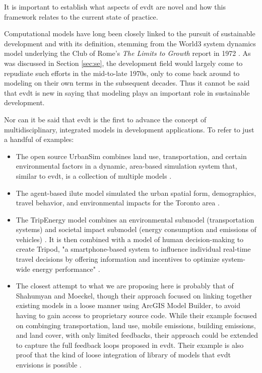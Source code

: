 \documentclass[notitlepage]{article}
\begin{document}
It is important to establish what aspects of \ac{evdt} are novel and how this framework relates to the current state of practice. 

Computational models have long been closely linked to the pursuit of sustainable development and with its definition, stemming from the World3 system dynamics model underlying the Club of Rome's \textit{The Limits to Growth} report in 1972 \cite{meadowsLimitsGrowth1972}. As was discussed in Section \ref{sec:se}, the development field would largely come to repudiate such efforts in the mid-to-late 1970s, only to come back around to modeling on their own terms in the subsequent decades. Thus it cannot be said that \ac{evdt} is new in saying that modeling plays an important role in sustainable development. 

Nor can it be said that \ac{evdt} is the first to advance the concept of multidisciplinary, integrated models in development applications. To refer to just a handful of examples:

\begin{itemize} \setlength{\itemsep}{0pt} \setlength{\parskip}{0pt}
	\item{The open source UrbanSim combines land use, transportation, and certain environmental factors in a dynamic, area-based simulation system that, similar to \ac{evdt}, is a collection of multiple models \cite{waddellUrbanSimModelingUrban2002}.}
	\item{The agent-based \ac{ilute} model simulated the urban spatial form, demographics, travel behavior, and environmental impacts for the Toronto area \cite{millerHistoricalValidationIntegrated2011}.}
	\item{The TripEnergy model combines an environmental submodel (transportation systems) and societal impact submodel (energy consumption and emissions of vehicles) \cite{needellEfficientlySimulatingPersonal2018}. It is then combined with a model of human decision-making to create Tripod, "a smartphone-based system to influence individual real-time travel decisions by offering information and incentives to optimize system-wide energy performance" \cite{azevedoTripodSustainableTravel2018}.}
	\item{The closest attempt to what we are proposing here is probably that of Shahumyan and Moeckel, though their approach focused on linking together existing models in a loose manner using ArcGIS Model Builder, to avoid having to gain access to proprietary source code. While their example focused on combinging transportation, land use, mobile emissions, building emissions, and land cover, with only limited feedbacks, their approach could be extended to capture the full feedback loops proposed in \ac{evdt}. Their example is also proof that the kind of loose integration of library of models that \ac{evdt} envisions is possible \cite{shahumyanIntegrationLandUse2017}.}
\end{itemize} 
\end{document}
